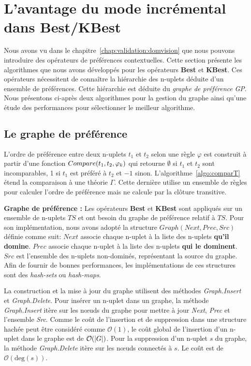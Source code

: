 \section{L'avantage du mode incrémental dans Best/KBest}\label{sec:valid:perfs:prefs}
Nous avons vu dans le chapitre~\ref{chap:validation:domvision} que nous pouvons introduire des opérateurs de préférences contextuelles. Cette section présente les algorithmes que nous avons développés pour les opérateurs \textbf{Best} et \textbf{KBest}. Ces opérateurs nécessitent de connaître la hiérarchie des n-uplets déduite d'un ensemble de préférences. Cette hiérarchie est déduite du \textit{graphe de préférence} \textit{GP}. Nous présentons ci-après deux algorithmes pour la gestion du graphe ainsi qu'une étude des performances pour sélectionner le meilleur algorithme.

\subsection{Le graphe de préférence}
L'ordre de préférence entre deux n-uplets $t_1$ et $t_2$ selon une règle $\varphi$ est construit à partir d'une fonction $Com\-pare(t_1,t_2,\varphi_k)$ qui retourne $\emptyset$ si $t_1$ et $t_2$ sont incomparables, 1 si $t_1$ est préféré à $t_2$ et $-1$ sinon. L'algorithme~\ref{algo:comparT} étend la comparaison à une théorie $\Gamma$. Cette dernière utilise un ensemble de règles pour calculer l'ordre de préférence mais ne calcule par la clôture transitive.

\textbf{Graphe de préférence : }
Les opérateurs \textbf{Best} et \textbf{KBest} sont appliqués sur un ensemble de n-uplets $TS$ et ont besoin du graphe de préférence relatif à $TS$.
Pour son implémentation, nous avons adopté la structure $Graph(Next, Prec, Src)$ définie comme suit:
 $Next$ associe chaque n-uplet à la liste des n-uplets \textbf{qu'il domine}.
 $Prec$ associe chaque n-uplet à la liste des n-uplets \textbf{qui le dominent}.
 $Src$ est l'ensemble des n-uplets non-dominés, représentant la source du graphe.
Afin de fournir de bonnes performances, les implémentations de ces structures sont des \textit{hash-sets} ou \textit{hash-maps}.

La construction et la mise à jour du graphe utilisent des méthodes \textit{Graph.Insert} et \textit{Graph.Delete}. Pour insérer un n-uplet dans un graphe, la méthode \textit{Graph.Insert} itère sur les nœuds du graphe pour mettre à jour \textit{Next}, \textit{Prec} et l'ensemble \textit{Src}. Comme le coût de l'insertion et de suppression dans une structure hachée peut être considéré comme $\mathcal O(1)$, le coût global de l'insertion d'un n-uplet dans le graphe est de $\mathcal O(\left| G \right|)$. Pour la suppression d'un n-uplet $s$ du graphe, la méthode \textit{Graph.Delete} itère sur les nœuds connectés à $s$. Le coût est de $\mathcal O(\mathrm{deg}(s))$.

